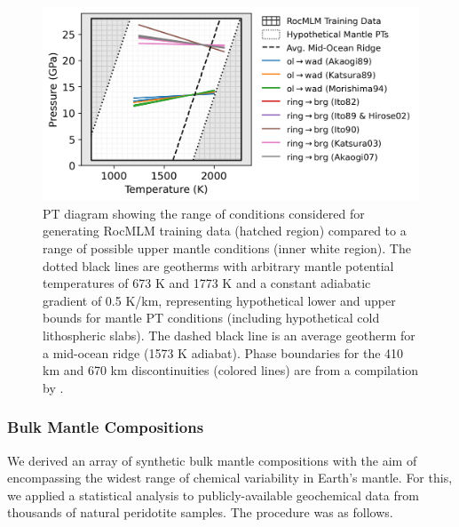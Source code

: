 \documentclass[draft,linenumbers]{agujournal2018}
\begin{document}
\begin{figure}[htbp]

{\centering \includegraphics[width=1\linewidth,]{training-dataset-design} 

}

\caption{PT diagram showing the range of conditions considered for generating RocMLM training data (hatched region) compared to a range of possible upper mantle conditions (inner white region). The dotted black lines are geotherms with arbitrary mantle potential temperatures of 673 K and 1773 K and a constant adiabatic gradient of 0.5 K/km, representing hypothetical lower and upper bounds for mantle PT conditions (including hypothetical cold lithospheric slabs). The dashed black line is an average geotherm for a mid-ocean ridge (1573 K adiabat). Phase boundaries for the 410 km and 670 km discontinuities (colored lines) are from a compilation by \citet{li2019}.}\label{fig:training-dataset-design}
\end{figure}

\subsubsection{Bulk Mantle Compositions}\label{sec:bulk-rock-compositions}

We derived an array of synthetic bulk mantle compositions with the aim of encompassing the widest range of chemical variability in Earth's mantle. For this, we applied a statistical analysis to publicly-available geochemical data from thousands of natural peridotite samples. The procedure was as follows.
\end{document}
